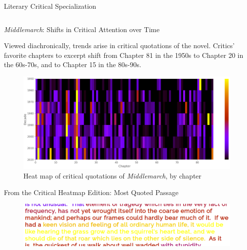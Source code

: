 \documentclass[final]{beamer}
\newlength{\onecolwid}
\newlength{\twocolwid}
\begin{document}
\begin{frame}[t]
\begin{columns}[t]
\begin{column}{\twocolwid}
\begin{columns}[t,totalwidth=\twocolwid]
\begin{column}{\onecolwid}
\begin{block}{Literary Critical Specialization}
\end{block}


\end{column} %

\end{columns} %


\begin{alertblock}{\emph{Middlemarch}: Shifts in Critical Attention over Time}

Viewed diachronically, trends arise in critical quotations of the novel. Critics' favorite chapters to excerpt shift from Chapter 81 in the 1950s to Chapter 20 in the 60s-70s, and to Chapter 15 in the 80s-90s. 

\begin{figure}
\includegraphics[width=0.8\linewidth]{diachronic.png}
\caption{Heat map of critical quotations of \emph{Middlemarch}, by chapter}
\end{figure}

\end{alertblock} 



\begin{block}{From the Critical Heatmap Edition: Most Quoted Passage}

\begin{figure}
\includegraphics[width=0.7\linewidth]{most-quoted.png}
\end{figure}
\end{block} 


\end{column}
\end{columns}
\end{frame}
\end{document}

